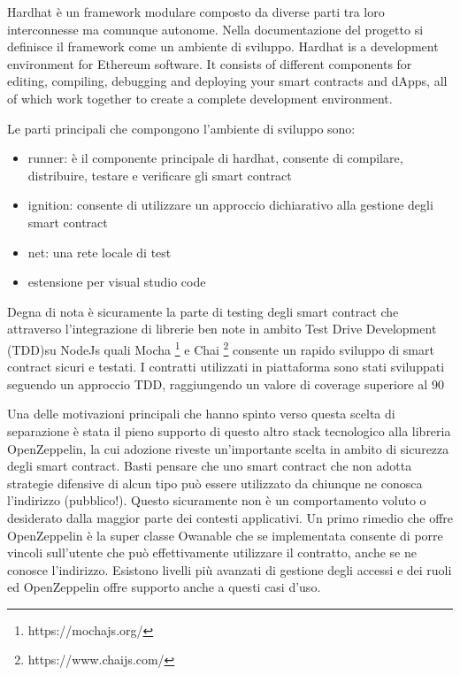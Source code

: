 \documentclass[a4paper,11pt]{article}
\begin{document}
Hardhat è un framework modulare composto da diverse parti tra loro interconnesse ma comunque autonome. Nella documentazione del progetto si definisce il framework come un ambiente di sviluppo. Hardhat is a development environment for Ethereum software. It consists of different components for editing, compiling, debugging and deploying your smart contracts and dApps, all of which work together to create a complete development environment. \cite{hardhatGettingStarted}

Le parti principali che compongono l'ambiente di sviluppo sono:

\begin{itemize}
  \item runner: è il componente principale di hardhat, consente di compilare, distribuire, testare e verificare gli smart contract
  \item ignition: consente di utilizzare un approccio dichiarativo alla gestione degli smart contract
  \item net: una rete locale di test
  \item estensione per visual studio code
\end{itemize}

Degna di nota è sicuramente la parte di testing degli smart contract che attraverso l'integrazione di librerie ben note in ambito Test Drive Development (TDD)su NodeJs quali Mocha \footnote{https://mochajs.org/} e Chai \footnote{https://www.chaijs.com/} consente un rapido sviluppo di smart contract sicuri e testati.
I contratti utilizzati in piattaforma sono stati sviluppati seguendo un approccio TDD, raggiungendo un valore di coverage superiore al 90%

Una delle motivazioni principali che hanno spinto verso questa scelta di separazione è stata il pieno supporto di questo altro stack tecnologico alla libreria OpenZeppelin, la cui adozione riveste un'importante scelta in ambito di sicurezza degli smart contract. Basti pensare che uno smart contract che non adotta strategie difensive di alcun tipo può essere utilizzato da chiunque ne conosca l'indirizzo (pubblico!). Questo sicuramente non è un comportamento voluto o desiderato dalla maggior parte dei contesti applicativi. Un primo rimedio che offre OpenZeppelin è la super classe Owanable che se implementata consente di porre vincoli sull'utente che può effettivamente utilizzare il contratto, anche se ne conosce l'indirizzo. Esistono livelli più avanzati di gestione degli accessi e dei ruoli ed OpenZeppelin offre supporto anche a questi casi d'uso.
\end{document}
